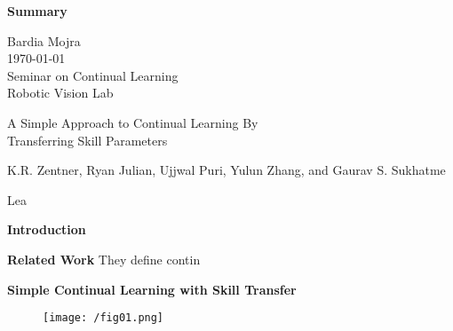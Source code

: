 \documentclass[12pt]{article}
\begin{document}
\begin{center}
\textbf{Summary}\\
\end{center}

\noindent
Bardia Mojra\\
\today\\
Seminar on Continual Learning\\
Robotic Vision Lab\\
\begin{center}
A Simple Approach to Continual Learning By\\
Transferring Skill Parameters\\
\end{center}
\begin{center}
  {\small K.R. Zentner, Ryan Julian, Ujjwal Puri, Yulun Zhang, and Gaurav S. Sukhatme}\\
\end{center}

Lea

\noindent
\textbf{Introduction}


\noindent
\textbf{Related Work}
They define contin

\noindent
\textbf{Simple Continual Learning with Skill Transfer}\\
\begin{figure}[h]
  \centering
  \texttt{[image: /fig01.png]}
\end{figure}




\newpage



\end{document}

